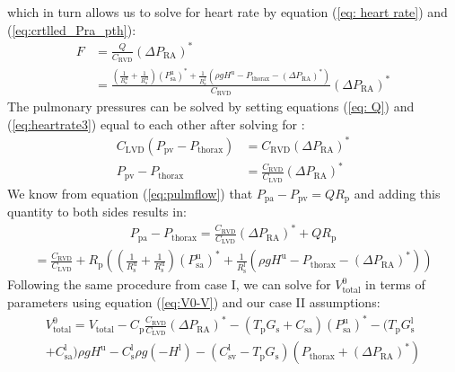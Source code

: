 \documentclass[12pt]{article}
\begin{document}
which in turn allows us to solve for heart rate by equation (\ref{eq: heart rate}) and (\ref{eq:crtlled_Pra_pth}):
\begin{align}
    F &= \frac{Q}{C_\text{RVD}} \left( \Delta P_\text{RA} \right)^* \label{eq:heartrate3}\\
    &= \frac{\left(\frac{1}{R_\text{s}^\text{u}} + \frac{1}{R_\text{s}^\text{u}}\right) (P_\text{sa}^\text{u})^* + \frac{1}{R_\text{s}^\text{l}} \left(\rho g H^\text{u} - P_\text{thorax} - \left( \Delta P_\text{RA} \right)^*\right)}{C_\text{RVD}} \left( \Delta P_\text{RA} \right)^* \label{eq: F-case2}
\end{align}
The pulmonary pressures can be solved by setting equations (\ref{eq: Q}) and (\ref{eq:heartrate3}) equal to each other after solving for :
\begin{align}
    C_\text{LVD}(P_\text{pv} - P_\text{thorax}) &= C_\text{RVD} \left( \Delta P_\text{RA} \right)^* \\
    P_\text{pv} - P_\text{thorax} &= \frac{C_\text{RVD}}{C_\text{LVD}}\left( \Delta P_\text{RA} \right)^* \label{eq:Ppv-Pthorax}
\end{align}
We know from equation (\ref{eq:pulmflow}) that $P_\text{pa}-P_\text{pv} = QR_\text{p}$ and adding this quantity to both sides results in: 
\begin{align}
    P_\text{pa} - P_\text{thorax}= \frac{C_\text{RVD}}{C_\text{LVD}}\left( \Delta P_\text{RA} \right)^* + QR_\text{p} \label{eq:Ppa-Pthorax}
    \end{align}
\begin{align}
    = \frac{C_\text{RVD}}{C_\text{LVD}}+R_\text{p}\left(\left(\frac{1}{R_\text{s}^\text{u}} + \frac{1}{R_\text{s}^\text{u}}\right) (P_\text{sa}^\text{u})^* + \frac{1}{R_\text{s}^\text{l}} \left(\rho g H^\text{u} - P_\text{thorax} - \left( \Delta P_\text{RA} \right)^*\right)\right)
\end{align}
Following the same procedure from case I, we can solve for $V^0_\text{total}$ in terms of parameters using equation (\ref{eq:V0-V}) and our case II assumptions:
\begin{equation}
    \begin{aligned}
    V_\text{total}^0 =  V_\text{total}- C_\text{p} \frac{C_\text{RVD}}{C_\text{LVD}}\left (\Delta P_{\text{RA}}\right)^* -\left(T_\text{p} G_\text{s}+C_\text{sa}\right)\left(P_\text{sa}^\text{u}\right)^* -(T_\text{p}G_\text{s}^\text{l}\\ 
     + C_\text{sa}^\text{l})\rho g H^\text{u} - C_\text{s}^\text{l} \rho g (-H^\text{l})-(C_\text{sv}^\text{l} - T_\text{p}G_\text{s})(P_\text{thorax} + (\Delta P_\text{RA})^*)\label{V0-case2}
    \end{aligned} 
\end{equation}
\end{document}
